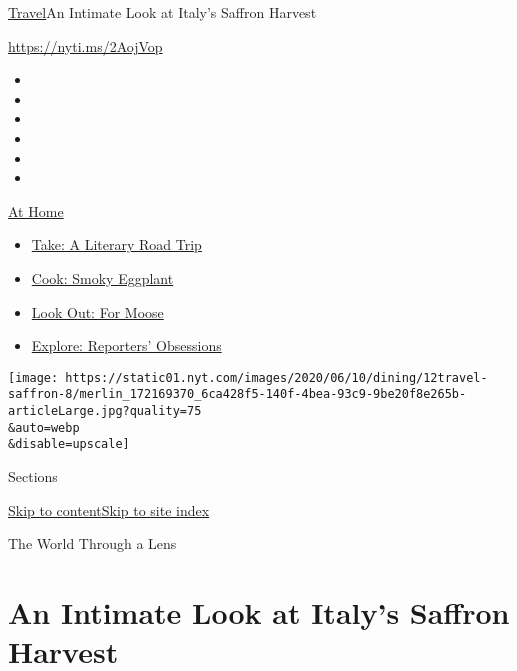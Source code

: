 \href{/section/travel}{Travel}\textbar{}An Intimate Look at Italy's
Saffron Harvest

\url{https://nyti.ms/2AojVop}

\begin{itemize}
\item
\item
\item
\item
\item
\item
\end{itemize}

\href{https://www.nytimes.com/spotlight/at-home?action=click\&pgtype=Article\&state=default\&region=TOP_BANNER\&context=at_home_menu}{At
Home}

\begin{itemize}
\tightlist
\item
  \href{https://www.nytimes.com/2020/07/28/books/time-for-a-literary-road-trip.html?action=click\&pgtype=Article\&state=default\&region=TOP_BANNER\&context=at_home_menu}{Take:
  A Literary Road Trip}
\item
  \href{https://www.nytimes.com/2020/07/29/magazine/bored-with-your-home-cooking-some-smoky-eggplant-will-fix-that.html?action=click\&pgtype=Article\&state=default\&region=TOP_BANNER\&context=at_home_menu}{Cook:
  Smoky Eggplant}
\item
  \href{https://www.nytimes.com/2020/07/27/travel/moose-michigan-isle-royale.html?action=click\&pgtype=Article\&state=default\&region=TOP_BANNER\&context=at_home_menu}{Look
  Out: For Moose}
\item
  \href{https://www.nytimes.com/interactive/2020/at-home/even-more-reporters-editors-diaries-lists-recommendations.html?action=click\&pgtype=Article\&state=default\&region=TOP_BANNER\&context=at_home_menu}{Explore:
  Reporters' Obsessions}
\end{itemize}

\texttt{[image: https://static01.nyt.com/images/2020/06/10/dining/12travel-saffron-8/merlin\_172169370\_6ca428f5-140f-4bea-93c9-9be20f8e265b-articleLarge.jpg?quality=75\\\&auto=webp\\\&disable=upscale]}

Sections

\protect\hyperlink{site-content}{Skip to
content}\protect\hyperlink{site-index}{Skip to site index}

The World Through a Lens

\hypertarget{an-intimate-look-at-italys-saffron-harvest}{%
\section{An Intimate Look at Italy's Saffron
Harvest}\label{an-intimate-look-at-italys-saffron-harvest}}

